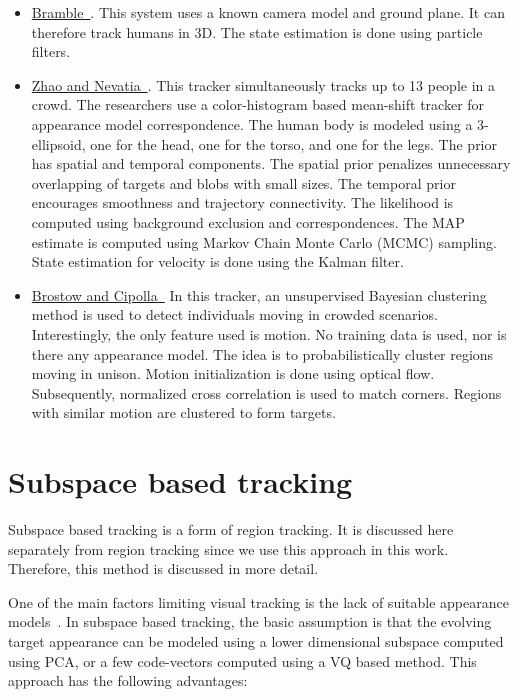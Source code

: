 \begin{itemize}
\item \underline{Bramble~\cite{2001_CNF_TRKhuman_Isard}}.  This system uses a known camera model and ground plane.  It can therefore track humans in 3D.  The state estimation is done using particle filters.  

\item \underline{Zhao and Nevatia~\cite{2004_CNF_TrackingPeople_Zhao}}.  This tracker simultaneously tracks up to 13 people in a crowd.  The researchers use a color-histogram based mean-shift tracker for appearance model correspondence.  The human body is modeled using a 3-ellipsoid, one for the head, one for the torso, and one for the legs.  The prior has spatial and temporal components.  The spatial prior penalizes unnecessary overlapping of targets and blobs with small sizes.  The temporal prior encourages smoothness and trajectory connectivity.  The likelihood is computed using background exclusion and correspondences.  The MAP estimate is computed using Markov Chain Monte Carlo (MCMC) sampling.  State estimation for velocity is done using the Kalman filter.

\item \underline{Brostow and Cipolla~\cite{2006_CNF_TRKhuman_Brostow}}  In this tracker, an unsupervised Bayesian clustering method is used to detect individuals moving in crowded scenarios.  Interestingly, the only feature used is motion.  No training data is used, nor is there any appearance model.  The idea is to probabilistically cluster regions moving in unison.  Motion initialization is done using optical flow.  Subsequently, normalized cross correlation is used to match corners.  Regions with similar motion are clustered to form targets.
\end{itemize}

\section{Subspace based tracking}
Subspace based tracking is a form of region tracking.  It is discussed here separately from region tracking since we use this approach in this work.  Therefore, this method is discussed in more detail.

One of the main factors limiting visual tracking is the lack of suitable appearance models~\cite{2003_JNL_TRKsubspace_Jepson}.  In subspace based tracking, the basic assumption is that the evolving target appearance can be modeled using a lower dimensional subspace computed using PCA, or a few code-vectors computed using a VQ based method.  This approach has the following advantages:

